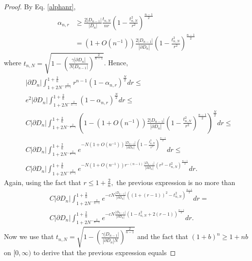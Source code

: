 \documentclass[10pt, twoside, leqno]{article}
\theoremstyle{definition}
\numberwithin{equation}{section}
\newcommand{\NN}{N^{-\frac 2{n-1} }}
\begin{document}
\begin{proof}
By Eq. \eqref{alphanr},
\begin{equation*}
\begin{aligned}
\alpha_{n,r} &\geq \frac{2|D_{n-1}|}{|D_n|}\frac {t_{n,N}}{nr} \left(1-\frac{t_{n,N}^2}{r^2}\right)^{\frac{n-1}{2}} \\&=\left(1+O\left(n^{-1}\right)\right)\frac{2|D_{n-1}|}{|\partial D_n|}\left(1-\frac{t_{n,N}^2}{r^2}\right)^{\frac{n-1}{2}}
\end{aligned}
\end{equation*}
where $t_{n,N}=\sqrt{1 - \left(\frac{\gamma|\partial D_n|}{N|D_{n-1}|}\right)^{\frac 2{n-1}}}$. Hence,
\begin{equation*}
\begin{aligned} & |\partial D_{n}|\int_{1+2\NN}^{1+\frac{2}{n}}r^{n-1}\left(1-\alpha_{n,r}\right)^{\frac{N}{2}}dr\leq\\
& e^{2}|\partial D_{n}|\int_{1+2\NN}^{1+\frac{2}{n}}\left(1-\alpha_{n,r}\right)^{\frac{N}{2}}dr\leq\\
& C|\partial D_{n}|\int_{1+2\NN}^{1+\frac{2}{n}}\left(1-\left(1+O\left(n^{-1}\right)\right)\frac{2|D_{n-1}|}{|\partial D_{n}|}\left(1-\frac{t_{n,N}^{2}}{r^{2}}\right)^{\frac{n-1}{2}}\right)^{\frac{N}{2}}dr\leq\\
& C|\partial D_{n}|\int_{1+2\NN}^{1+\frac{2}{n}}e^{-N\left(1+O\left(n^{-1}\right)\right)\frac{|D_{n-1}|}{|\partial D_{n}|}\left(1-\frac{t_{n,N}^{2}}{r^{2}}\right)^{\frac{n-1}{2}}}dr\leq\\
& C|\partial D_{n}|\int_{1+2\NN}^{1+\frac{2}{n}}e^{-N\left(1+O\left(n^{-1}\right)\right)r{}^{-\left(n-1\right)}\frac{|D_{n-1}|}{|\partial D_{n}|}\left(r^{2}-t_{n,N}^{2}\right)^{\frac{n-1}{2}}}dr.
\end{aligned}
\end{equation*}
Again, using the fact that $ r \leq 1 + \frac 2n, $ the previous expression is no more than
\begin{equation*}
\begin{aligned} & C|\partial D_{n}|\int_{1+2\NN}^{1+\frac{2}{n}}e^{-cN\frac{|D_{n-1}|}{|\partial D_{n}|}\left(\left(1+\left(r-1\right)\right)^{2}-t_{n,N}^{2}\right)^{\frac{n-1}{2}}}dr=\\
& C|\partial D_{n}|\int_{1+2\NN}^{1+\frac{2}{n}}e^{-cN\frac{|D_{n-1}|}{|\partial D_{n}|}\left(1-t_{n,N}^{2}+2\left(r-1\right)\right)^{\frac{n-1}{2}}}dr.
\end{aligned}
\end{equation*}
Now we use that $t_{n,N} = \sqrt{1-\left(\frac{\gamma|D_{n-1}|}{|\partial D_n|N}\right)^{\frac 2{n-1}}}  $ and the fact that $ \left(1+b\right)^n\geq 1+nb $ on $ [0,\infty) $ to derive that the previous expression equals

\end{proof}
\end{document}
